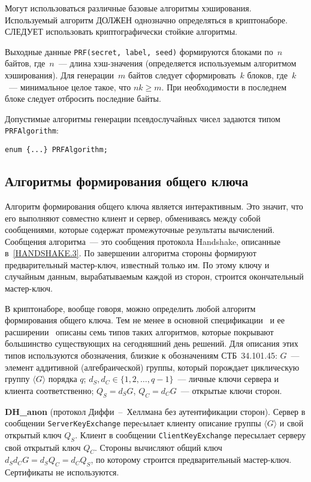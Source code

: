 Могут использоваться различные базовые алгоритмы хэширования. Используемый 
алгоритм ДОЛЖЕН однозначно определяться в криптонаборе. СЛЕДУЕТ 
использовать криптографически стойкие алгоритмы. 

Выходные данные \lstinline{PRF(secret, label, seed)} формируются блоками 
по~$n$ байтов, где~$n$~--- длина хэш-значения 
(определяется используемым алгоритмом хэширования). Для генерации~$m$ 
байтов следует сформировать~$k$ блоков, где~$k$~--- минимальное целое 
такое, что $nk\geq m$.  
При необходимости в последнем 
блоке следует отбросить последние байты. 

Допустимые алгоритмы генерации псевдослучайных чисел задаются типом 
\lstinline{PRFAlgorithm}: 
\begin{lstlisting}
enum {...} PRFAlgorithm;
\end{lstlisting}

\subsection{Алгоритмы формирования общего ключа}\label{CRYPTO.2.4}

Алгоритм формирования общего ключа является интерактивным. Это значит, что
его выполняют совместно клиент и сервер, обмениваясь между собой
сообщениями, которые содержат промежуточные результаты вычислений.
Сообщения алгоритма~--- это сообщения протокола Handshake, описанные 
в~\ref{HANDSHAKE.3}. По завершении алгоритма стороны формируют 
предварительный мастер-ключ, известный только им. По этому ключу и 
случайным данным, вырабатываемым каждой из сторон, строится окончательный 
мастер-ключ. 

В криптонаборе, вообще говоря, можно определить любой алгоритм 
формирования общего ключа. Тем не менее в основной спецификации~\cite{RFC5246} 
и ее расширении~\cite{RFC4279} описаны семь типов таких алгоритмов, 
которые покрывают большинство существующих на сегодняшний день решений. 
Для описания этих типов используются обозначения, близкие к обозначениям 
СТБ~34.101.45:  
$G$~--- элемент аддитивной (алгебраической) группы, который порождает 
циклическую группу $\langle G \rangle$ порядка $q$; 
$d_S, d_C \in \{1, 2,\ldots, q - 1\}$~--- личные ключи сервера и клиента 
соответственно;  
$Q_S = d_S G$, $Q_C = d_C G$~--- открытые ключи сторон. 

{\bf DH\_anon} (протокол Диффи~--~Хеллмана без аутентификации сторон). Сервер 
в сообщении \lstinline{ServerKeyExchange} переcылает клиенту описание группы 
$\langle G \rangle$ и свой открытый ключ $Q_S$. Клиент в сообщении 
\lstinline{ClientKeyExchange} пересылает серверу свой открытый ключ $Q_C$. 
Стороны вычисляют общий ключ $d_S d_C G = d_S Q_C = d_C Q_S$, по 
которому строится предварительный мастер-ключ. Сертификаты не 
используются. 

